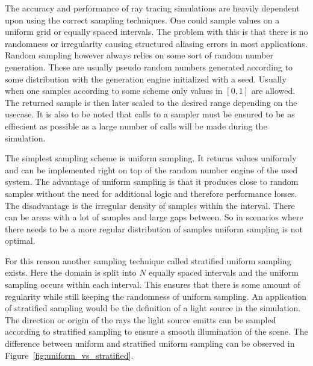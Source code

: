 \documentclass[a4paper,10pt]{article}
\newcommand{\figref}[1]{Figure~\ref{#1}}
\begin{document}
    The accuracy and performance of ray tracing simulations are heavily dependent upon
    using the correct sampling techniques.
    One could sample values on a uniform grid or equally spaced intervals.
    The problem with this is that there is no randomness or irregularity
    causing structured aliasing errors in most applications. 
    Random sampling however always relies on some sort of random number generation.
    These are usually pseudo random numbers generated according to some
    distribution with the generation engine initialized with a seed.
    Usually when one samples according to some scheme only values in 
    $[0,1]$ are allowed.
    The returned sample is then later scaled to the desired range depending
    on the usecase.
    It is also to be noted that calls to a sampler must be ensured to
    be as effiecient as possible as a large number of calls will be
    made during the simulation.

    The simplest sampling scheme is uniform sampling.
    It returns values uniformly and can be implemented right on top of
    the random number engine of the used system.
    The advantage of uniform sampling is that it produces close to random
    samples without the need for additional logic and therefore
    performance losses.
    The disadvantage is the irregular density of samples within the interval.
    There can be areas with a lot of samples and large gaps between.
    So in scenarios where there needs to be a more regular distribution
    of samples uniform sampling is not optimal.

    For this reason another sampling technique called stratified uniform
    sampling exists.
    Here the domain is split into $N$ equally spaced intervals and the
    uniform sampling occurs within each interval.
    This ensures that there is some amount of regularity while still
    keeping the randomness of uniform sampling.
    An application of stratified sampling would be the definition of
    a light source in the simulation.
    The direction or origin of the rays the light source emitts can be
    sampled according to stratified sampling to ensure a smooth
    illumination of the scene.
    The difference between uniform and stratified uniform sampling can
    be observed in \figref{fig:uniform_vs_stratified}.
\end{document}
